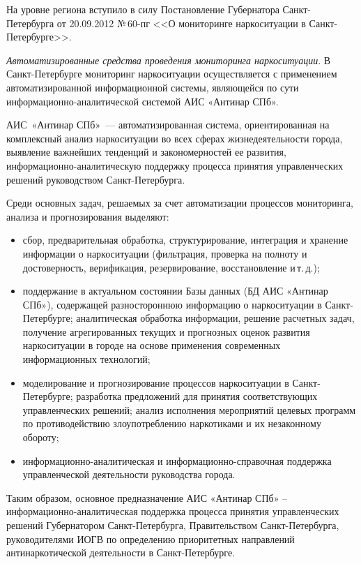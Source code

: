На уровне региона вступило в силу Постановление Губернатора Санкт-Петербурга от
20.09.2012 №\,60-пг <<О мониторинге наркоситуации в Санкт-Петербурге>>.

\textit{Автоматизированные средства проведения мониторинга наркоситуации}.
В Санкт-Петербурге мониторинг наркоситуации осуществляется с применением
автоматизированной информационной системы, являющейся по сути
информационно-аналитической системой АИС «Антинар СПб».

АИС~«Антинар СПб»~--- автоматизированная система, ориентированная  на комплексный
анализ наркоситуации во всех сферах  жизнедеятельности города, выявление
важнейших тенденций и закономерностей ее развития, информационно-аналитическую
поддержку процесса принятия управленческих решений руководством
Санкт-Петербурга.

Среди основных задач, решаемых за счет автоматизации процессов мониторинга,
анализа и прогнозирования выделяют:
\begin{itemize}
\item сбор, предварительная обработка, структурирование, интеграция и хранение
информации о наркоситуации (фильтрация, проверка на полноту и достоверность,
верификация, резервирование, восстановление и\,т.\,д.);
\item поддержание в актуальном состоянии Базы данных (БД АИС «Антинар СПб»),
содержащей разностороннюю информацию о наркоситуации в Санкт-Петербурге;
аналитическая обработка информации, решение расчетных задач, получение
агрегированных текущих и прогнозных оценок развития наркоситуации в городе на
основе применения современных информационных технологий;
\item моделирование и прогнозирование процессов наркоситуации в Санкт-Петербурге;
разработка предложений для принятия соответствующих управленческих решений;
анализ исполнения мероприятий целевых программ по противодействию
злоупотреблению наркотиками и их незаконному обороту;
\item информационно-аналитическая и информационно-справочная поддержка
управленческой деятельности руководства города.
\end{itemize}
Таким образом, основное предназначение АИС «Антинар СПб» –
информационно-аналитическая поддержка процесса принятия управленческих решений
Губернатором Санкт-Петербурга, Правительством Санкт-Петербурга, руководителями
ИОГВ по определению приоритетных направлений антинаркотической деятельности в
Санкт-Петербурге. 

